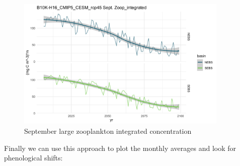 \documentclass[
]{article}
\begin{document}
\begin{figure}
\centering
\includegraphics[width=0.9\textwidth,height=\textheight]{Figs/Sept_large_Zoop.jpg}
\caption{September large zooplankton integrated concentration}
\end{figure}

Finally we can use this approach to plot the monthly averages and look
for phenological shifts:
\end{document}
